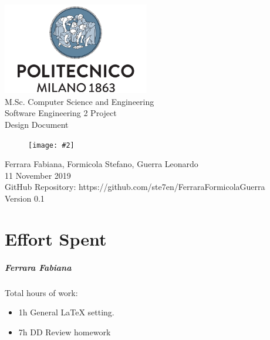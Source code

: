 \documentclass{report}
\newcommand{\image}[4]{
	\begin{figure}[H]
	\centering
	\texttt{[image: \#2]}
	\caption*{#3}
	\label{#4}

	\label{fig:nonfloat} %
	\end{figure}
}
\begin{document}
	\begin{titlepage}
		\centering	
		\vfill
		{
			\includegraphics[width =\linewidth, height = 4cm, keepaspectratio]{./Images/PolitecnicoLogo.png}
			\label{fig:PolitecnicoLogo}
			\large \\[2ex]M.Sc. Computer Science and Engineering\\
			\large Software Engineering 2 Project\\[9ex]			
			\huge Design Document\\[4ex]
			\image{3cm}{Images/Logo.png}{}{Logo}

			\normalsize Ferrara Fabiana, Formicola Stefano, Guerra Leonardo\\[1.5ex]
			\normalsize 11 November 2019 \\[1.5ex]
			\normalsize GitHub Repository: https://github.com/ste7en/FerraraFormicolaGuerra\\[3ex]
			\normalsize Version 0.1


		}
		
	\end{titlepage}


	
	\newpage
	\tableofcontents
	\thispagestyle{fancy}
	

	
	
	
	
	
	
		
	\chapter{Effort Spent}
	\thispagestyle{fancy}
		\paragraph{Ferrara Fabiana} Total hours of work: 
			\begin{itemize}
				\item 1h General LaTeX setting.
				\item 7h DD Review homework
				
			\end{itemize}
\end{document}
